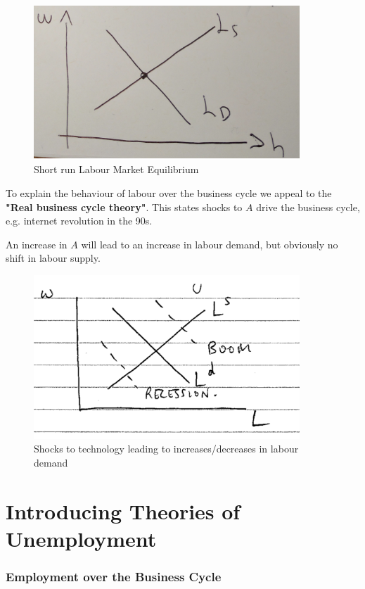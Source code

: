 \documentclass[11pt]{article}
\begin{document}
\begin{figure}[h]
    \centering
    \includegraphics[width=10cm]{photos/short run labour market equilibrium.png}
    \caption{Short run Labour Market Equilibrium}
    \label{fig:labour market equilibrium}
\end{figure}

To explain the behaviour of labour over the business cycle we appeal to the \textbf{"Real business cycle theory"}. This states shocks to $A$ drive the business cycle, e.g. internet revolution in the 90s.

An increase in $A$ will lead to an increase in labour demand, but obviously no shift in labour supply.

\begin{figure}[h]
    \centering
    \includegraphics[width=10cm]{photos/labour market shocks to A.png}
    \caption{Shocks to technology leading to increases/decreases in labour demand}
    \label{fig:labour market shocks}
\end{figure}


\newpage

\section{Introducing Theories of Unemployment}

\subsubsection{Employment over the Business Cycle}
\end{document}

